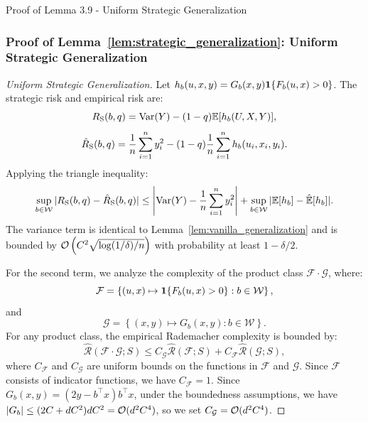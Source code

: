 \begin{sourceblock}{Proof of Lemma 3.9 - Uniform Strategic Generalization}
\subsubsection*{Proof of Lemma~\ref{lem:strategic_generalization}: Uniform Strategic Generalization}
\label{app:proof_strategic_generalization}
\begin{proof}[Uniform Strategic Generalization]
Let $h_b(u, x, y) = G_b(x, y)\mathbf{1}\{F_b(u, x) > 0\}$. The strategic risk and empirical risk are:
\begin{equation}
    R_{\mathrm{S}}(b, q) = \mathrm{Var}(Y) - (1 - q)\mathbb{E}[h_b(U, X, Y)],
\end{equation}
\begin{equation}
    \hat{R}_{\mathrm{S}}(b, q) = \frac{1}{n}\sum_{i=1}^n y_i^2 - (1 - q)\frac{1}{n}\sum_{i=1}^n h_b(u_i, x_i, y_i).
\end{equation}
Applying the triangle inequality:
\begin{equation}
    \sup_{b \in \mathcal{W}} |R_{\mathrm{S}}(b, q) - \hat{R}_{\mathrm{S}}(b, q)| \le \left| \mathrm{Var}(Y) - \frac{1}{n}\sum_{i=1}^n y_i^2 \right| + \sup_{b \in \mathcal{W}} |\mathbb{E}[h_b] - \hat{\mathbb{E}}[h_b]|.
\end{equation}
The variance term is identical to Lemma~\ref{lem:vanilla_generalization} and is bounded by $\mathcal{O}\left( C^2\sqrt{\log(1/\delta)/n} \right)$ with probability at least $1 - \delta/2$.

For the second term, we analyze the complexity of the product class $\mathcal{F} \cdot \mathcal{G}$, where:
\begin{equation}
    \mathcal{F} = \left\{ (u, x) \mapsto \mathbf{1}\{F_b(u, x) > 0\} : b \in \mathcal{W} \right\},
\end{equation}
and
\begin{equation}
    \mathcal{G} = \left\{ (x, y) \mapsto G_b(x, y) : b \in \mathcal{W} \right\}.
\end{equation}
For any product class, the empirical Rademacher complexity is bounded by:
\begin{equation}
    \hat{\mathcal{R}}(\mathcal{F} \cdot \mathcal{G}; S) \le C_{\mathcal{G}}\hat{\mathcal{R}}(\mathcal{F}; S) + C_{\mathcal{F}}\hat{\mathcal{R}}(\mathcal{G}; S),
\end{equation}
where $C_{\mathcal{F}}$ and $C_{\mathcal{G}}$ are uniform bounds on the functions in $\mathcal{F}$ and $\mathcal{G}$. 
Since $\mathcal{F}$ consists of indicator functions, we have $C_{\mathcal{F}} = 1$. Since $G_b(x, y) = (2y - b^\top x)b^\top x$, under the boundedness assumptions, we have $|G_b| \le (2C + dC^2)dC^2 = \mathcal{O}(d^2 C^4)$, so we set $C_{\mathcal{G}} = \mathcal{O}(d^2 C^4)$.


\end{proof}
\end{sourceblock}
